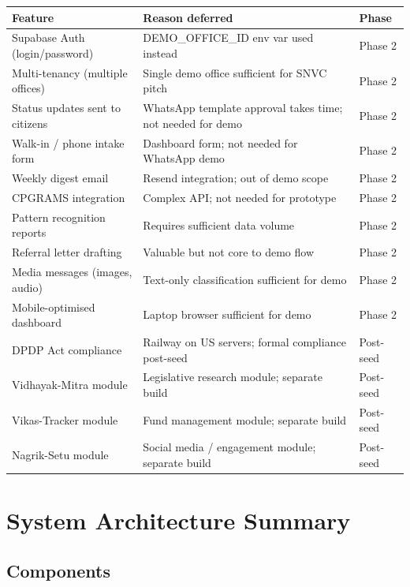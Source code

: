 \documentclass[11pt, a4paper]{article}
\begin{document}
\renewcommand{\arraystretch}{1.3}
\begin{tabularx}{\linewidth}{lXl}
\toprule
\textbf{Feature} & \textbf{Reason deferred} & \textbf{Phase} \\
\midrule
Supabase Auth (login/password) & DEMO\_OFFICE\_ID env var used instead & Phase 2 \\
Multi-tenancy (multiple offices) & Single demo office sufficient for SNVC pitch & Phase 2 \\
Status updates sent to citizens & WhatsApp template approval takes time; not needed for demo & Phase 2 \\
Walk-in / phone intake form & Dashboard form; not needed for WhatsApp demo & Phase 2 \\
Weekly digest email & Resend integration; out of demo scope & Phase 2 \\
CPGRAMS integration & Complex API; not needed for prototype & Phase 2 \\
Pattern recognition reports & Requires sufficient data volume & Phase 2 \\
Referral letter drafting & Valuable but not core to demo flow & Phase 2 \\
Media messages (images, audio) & Text-only classification sufficient for demo & Phase 2 \\
Mobile-optimised dashboard & Laptop browser sufficient for demo & Phase 2 \\
DPDP Act compliance & Railway on US servers; formal compliance post-seed & Post-seed \\
Vidhayak-Mitra module & Legislative research module; separate build & Post-seed \\
Vikas-Tracker module & Fund management module; separate build & Post-seed \\
Nagrik-Setu module & Social media / engagement module; separate build & Post-seed \\
\bottomrule
\end{tabularx}

\newpage

\section{System Architecture Summary}

\subsection{Components}
\end{document}

